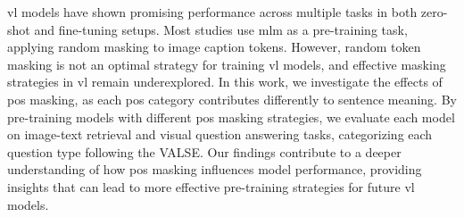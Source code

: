 
\setlength{\parindent}{0pt}
\setlength{\parskip}{1em}
\setlength{\baselineskip}{1.5em}

\begin{center}
  \fontsize{14}{17}
\end{center}
\vspace{2em}

\acrfull{vl} models have shown promising performance across multiple tasks in both zero-shot and fine-tuning setups. 
Most studies use \acrlong{mlm} as a pre-training task, applying random masking to image caption tokens. 
However, random token masking is not an optimal strategy for training \acrshort{vl} models, and effective masking strategies in \acrshort{vl} remain underexplored. 
In this work, we investigate the effects of \acrfull{pos} masking, as each \acrshort{pos} category contributes differently to sentence meaning. 
By pre-training models with different \acrshort{pos} masking strategies, we evaluate each model on image-text retrieval and visual question answering tasks, categorizing each question type following the VALSE.
Our findings contribute to a deeper understanding of how \acrshort{pos} masking influences model performance, providing insights that can lead to more effective pre-training strategies for future \acrshort{vl} models.

    
